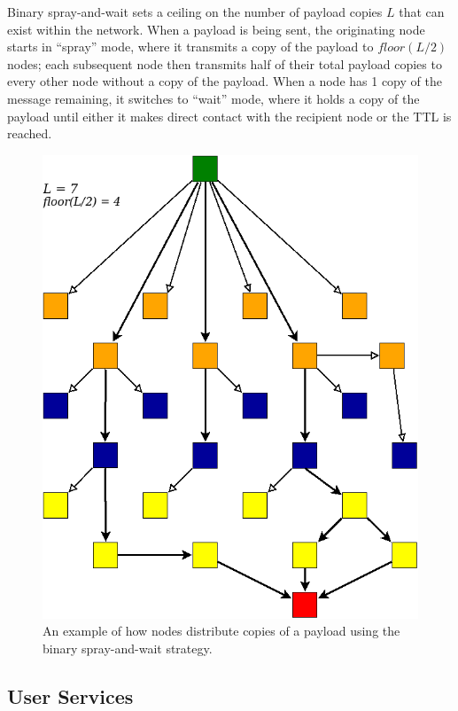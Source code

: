 \documentclass[12pt]{article}
\begin{document}
    Binary spray-and-wait sets a ceiling on the number of payload copies \(L\) that can exist within the network. When a payload is being sent, the originating node starts in ``spray'' mode, where it transmits a copy of the payload to \(floor(L/2)\) nodes; each subsequent node then transmits half of their total payload copies to every other node without a copy of the payload. When a node has 1 copy of the message remaining, it switches to ``wait'' mode, where it holds a copy of the payload until either it makes direct contact with the recipient node or the TTL is reached.
    
    \begin{figure}[h]
      \centering{}
      \includegraphics[scale=0.45]{Diagram2.png}
      \caption{An example of how nodes distribute copies of a payload using the binary spray-and-wait strategy.}
    \end{figure}
    
  \subsection{User Services}
  
\end{document}
